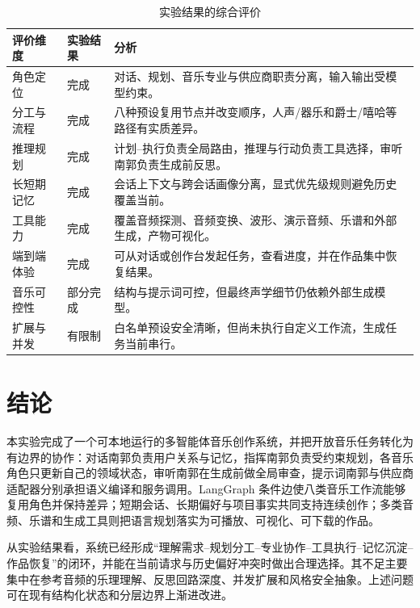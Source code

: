 \documentclass{SYSUReport}
\begin{document}
\begin{table}[H]
    \centering
    \caption{实验结果的综合评价}
    \label{tab:evaluation}
    \begin{tabularx}{\textwidth}{L{3.0cm}L{3.0cm}Y}
        \toprule
        评价维度 & 实验结果 & 分析 \\
        \midrule
        角色定位 & 完成 & 对话、规划、音乐专业与供应商职责分离，输入输出受模型约束。 \\
        分工与流程 & 完成 & 八种预设复用节点并改变顺序，人声/器乐和爵士/嘻哈等路径有实质差异。 \\
        推理规划 & 完成 & 计划--执行负责全局路由，推理与行动负责工具选择，审听南郭负责生成前反思。 \\
        长短期记忆 & 完成 & 会话上下文与跨会话画像分离，显式优先级规则避免历史覆盖当前。 \\
        工具能力 & 完成 & 覆盖音频探测、音频变换、波形、演示音频、乐谱和外部生成，产物可视化。 \\
        端到端体验 & 完成 & 可从对话或创作台发起任务，查看进度，并在作品集中恢复结果。 \\
        音乐可控性 & 部分完成 & 结构与提示词可控，但最终声学细节仍依赖外部生成模型。 \\
        扩展与并发 & 有限制 & 白名单预设安全清晰，但尚未执行自定义工作流，生成任务当前串行。 \\
        \bottomrule
    \end{tabularx}
\end{table}

\section{结论}

本实验完成了一个可本地运行的多智能体音乐创作系统，并把开放音乐任务转化为有边界的协作：对话南郭负责用户关系与记忆，指挥南郭负责受约束规划，各音乐角色只更新自己的领域状态，审听南郭在生成前做全局审查，提示词南郭与供应商适配器分别承担语义编译和服务调用。LangGraph 条件边使八类音乐工作流能够复用角色并保持差异；短期会话、长期偏好与项目事实共同支持连续创作；多类音频、乐谱和生成工具则把语言规划落实为可播放、可视化、可下载的作品。

从实验结果看，系统已经形成“理解需求--规划分工--专业协作--工具执行--记忆沉淀--作品恢复”的闭环，并能在当前请求与历史偏好冲突时做出合理选择。其不足主要集中在参考音频的乐理理解、反思回路深度、并发扩展和风格安全抽象。上述问题可在现有结构化状态和分层边界上渐进改进。


\clearpage
\end{document}
